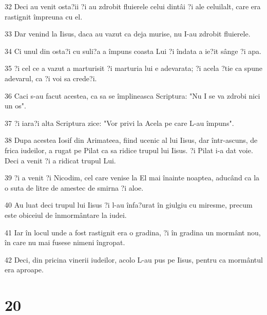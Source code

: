 \par 32 Deci au venit osta?ii ?i au zdrobit fluierele celui dintâi ?i ale celuilalt, care era rastignit împreuna cu el.
\par 33 Dar venind la Iisus, daca au vazut ca deja murise, nu I-au zdrobit fluierele.
\par 34 Ci unul din osta?i cu suli?a a împuns coasta Lui ?i îndata a ie?it sânge ?i apa.
\par 35 ?i cel ce a vazut a marturisit ?i marturia lui e adevarata; ?i acela ?tie ca spune adevarul, ca ?i voi sa crede?i.
\par 36 Caci s-au facut acestea, ca sa se împlineasca Scriptura: "Nu I se va zdrobi nici un os".
\par 37 ?i iara?i alta Scriptura zice: "Vor privi la Acela pe care L-au împuns".
\par 38 Dupa acestea Iosif din Arimateea, fiind ucenic al lui Iisus, dar într-ascuns, de frica iudeilor, a rugat pe Pilat ca sa ridice trupul lui Iisus. ?i Pilat i-a dat voie. Deci a venit ?i a ridicat trupul Lui.
\par 39 ?i a venit ?i Nicodim, cel care venise la El mai înainte noaptea, aducând ca la o suta de litre de amestec de smirna ?i aloe.
\par 40 Au luat deci trupul lui Iisus ?i l-au înfa?urat în giulgiu cu miresme, precum este obiceiul de înmormântare la iudei.
\par 41 Iar în locul unde a fost rastignit era o gradina, ?i în gradina un mormânt nou, în care nu mai fusese nimeni îngropat.
\par 42 Deci, din pricina vinerii iudeilor, acolo L-au pus pe Iisus, pentru ca mormântul era aproape.

\chapter{20}

